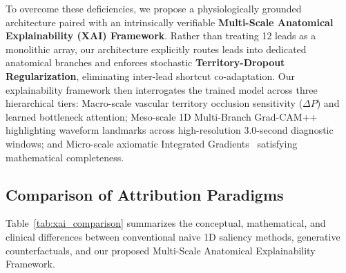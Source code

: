 \documentclass[12pt]{elsarticle}
\begin{document}
To overcome these deficiencies, we propose a physiologically grounded architecture paired with an intrinsically verifiable \textbf{Multi-Scale Anatomical Explainability (XAI) Framework}. Rather than treating 12 leads as a monolithic array, our architecture explicitly routes leads into dedicated anatomical branches and enforces stochastic \textbf{Territory-Dropout Regularization}, eliminating inter-lead shortcut co-adaptation. Our explainability framework then interrogates the trained model across three hierarchical tiers: Macro-scale vascular territory occlusion sensitivity ($\Delta P$) and learned bottleneck attention; Meso-scale 1D Multi-Branch Grad-CAM++~\cite{chattopadhay2018grad} highlighting waveform landmarks across high-resolution 3.0-second diagnostic windows; and Micro-scale axiomatic Integrated Gradients~\cite{sundararajan2017axiomatic} satisfying mathematical completeness.

\subsection{Comparison of Attribution Paradigms}
Table~\ref{tab:xai_comparison} summarizes the conceptual, mathematical, and clinical differences between conventional naive 1D saliency methods, generative counterfactuals, and our proposed Multi-Scale Anatomical Explainability Framework.
\end{document}
